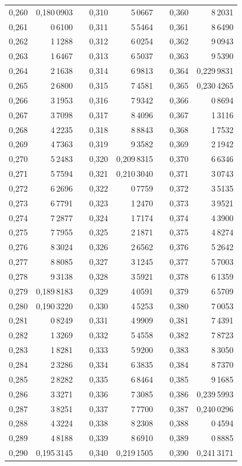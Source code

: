 \begin{tabular}{|r|r|@{}p{9pt}@{}|r|r|@{}p{9pt}@{}|r|r|}
0,260 & 0,180\,0903 &  & 0,310 & 5\,0667 &  & 0,360 & 8\,2031 \\[3pt]
0,261 & 0\,6100 &  & 0,311 & 5\,5464 &  & 0,361 & 8\,6490 \\
0,262 & 1\,1288 &  & 0,312 & 6\,0254 &  & 0,362 & 9\,0943 \\
0,263 & 1\,6467 &  & 0,313 & 6\,5037 &  & 0,363 & 9\,5390 \\
0,264 & 2\,1638 &  & 0,314 & 6\,9813 &  & 0,364 & 0,229\,9831 \\
0,265 & 2\,6800 &  & 0,315 & 7\,4581 &  & 0,365 & 0,230\,4265 \\[3pt]
0,266 & 3\,1953 &  & 0,316 & 7\,9342 &  & 0,366 & 0\,8694 \\
0,267 & 3\,7098 &  & 0,317 & 8\,4096 &  & 0,367 & 1\,3116 \\
0,268 & 4\,2235 &  & 0,318 & 8\,8843 &  & 0,368 & 1\,7532 \\
0,269 & 4\,7363 &  & 0,319 & 9\,3582 &  & 0,369 & 2\,1942 \\
0,270 & 5\,2483 &  & 0,320 & 0,209\,8315 &  & 0,370 & 6\,6346 \\[3pt]
0,271 & 5\,7594 &  & 0,321 & 0,210\,3040 &  & 0,371 & 3\,0743 \\
0,272 & 6\,2696 &  & 0,322 & 0\,7759 &  & 0,372 & 3\,5135 \\
0,273 & 6\,7791 &  & 0,323 & 1\,2470 &  & 0,373 & 3\,9521 \\
0,274 & 7\,2877 &  & 0,324 & 1\,7174 &  & 0,374 & 4\,3900 \\
0,275 & 7\,7955 &  & 0,325 & 2\,1871 &  & 0,375 & 4\,8274 \\[3pt]
0,276 & 8\,3024 &  & 0,326 & 2\,6562 &  & 0,376 & 5\,2642 \\
0,277 & 8\,8085 &  & 0,327 & 3\,1245 &  & 0,377 & 5\,7003 \\
0,278 & 9\,3138 &  & 0,328 & 3\,5921 &  & 0,378 & 6\,1359 \\
0,279 & 0,189\,8183 &  & 0,329 & 4\,0591 &  & 0,379 & 6\,5709 \\
0,280 & 0,190\,3220 &  & 0,330 & 4\,5253 &  & 0,380 & 7\,0053 \\[3pt]
0,281 & 0\,8249 &  & 0,331 & 4\,9909 &  & 0,381 & 7\,4391 \\
0,282 & 1\,3269 &  & 0,332 & 5\,4558 &  & 0,382 & 7\,8723 \\
0,283 & 1\,8281 &  & 0,333 & 5\,9200 &  & 0,383 & 8\,3050 \\
0,284 & 2\,3286 &  & 0,334 & 6\,3835 &  & 0,384 & 8\,7370 \\
0,285 & 2\,8282 &  & 0,335 & 6\,8464 &  & 0,385 & 9\,1685 \\[3pt]
0,286 & 3\,3271 &  & 0,336 & 7\,3085 &  & 0,386 & 0,239\,5993 \\
0,287 & 3\,8251 &  & 0,337 & 7\,7700 &  & 0,387 & 0,240\,0296 \\
0,288 & 4\,3224 &  & 0,338 & 8\,2308 &  & 0,388 & 0\,4594 \\
0,289 & 4\,8188 &  & 0,339 & 8\,6910 &  & 0,389 & 0\,8885 \\
0,290 & 0,195\,3145 &  & 0,340 & 0,219\,1505 &  & 0,390 & 0,241\,3171 \\
\hline
\end{tabular}\par
